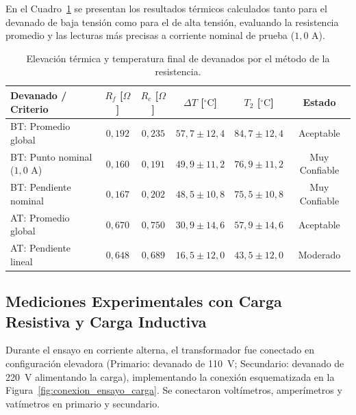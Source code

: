 En el Cuadro~\ref{tab:elevacion_temperatura} se presentan los resultados térmicos calculados tanto para el devanado de baja tensión como para el de alta tensión, evaluando la resistencia promedio y las lecturas más precisas a corriente nominal de prueba ($1{,}0\text{ A}$).

\begin{table}[htbp]
    \centering
    \caption{Elevación térmica y temperatura final de devanados por el método de la resistencia.}
    \label{tab:elevacion_temperatura}
    \begin{tabular}{l c c c c c}
        \toprule
        \textbf{Devanado / Criterio} & \textbf{$R_f$ [$\Omega$]} & \textbf{$R_c$ [$\Omega$]} & \textbf{$\Delta T$ [$^{\circ}\mathrm{C}$]} & \textbf{$T_2$ [$^{\circ}\mathrm{C}$]} & \textbf{Estado} \\
        \midrule
        BT: Promedio global & $0{,}192$ & $0{,}235$ & $57{,}7 \pm 12{,}4$ & $84{,}7 \pm 12{,}4$ & Aceptable \\
        BT: Punto nominal ($1{,}0\text{ A}$) & $0{,}160$ & $0{,}191$ & $49{,}9 \pm 11{,}2$ & $76{,}9 \pm 11{,}2$ & Muy Confiable \\
        BT: Pendiente nominal & $0{,}167$ & $0{,}202$ & $48{,}5 \pm 10{,}8$ & $75{,}5 \pm 10{,}8$ & Muy Confiable \\
        \midrule
        AT: Promedio global & $0{,}670$ & $0{,}750$ & $30{,}9 \pm 14{,}6$ & $57{,}9 \pm 14{,}6$ & Aceptable \\
        AT: Pendiente lineal & $0{,}648$ & $0{,}689$ & $16{,}5 \pm 12{,}0$ & $43{,}5 \pm 12{,}0$ & Moderado \\
        \bottomrule
    \end{tabular}
\end{table}

\subsection{Mediciones Experimentales con Carga Resistiva y Carga Inductiva}

Durante el ensayo en corriente alterna, el transformador fue conectado en configuración elevadora (Primario: devanado de 110~V; Secundario: devanado de 220~V alimentando la carga), implementando la conexión esquematizada en la Figura~\ref{fig:conexion_ensayo_carga}. Se conectaron voltímetros, amperímetros y vatímetros en primario y secundario. 

